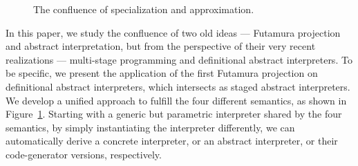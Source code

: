 \vspace{-1em}
\begin{figure}[h]
  \caption{The confluence of specialization and approximation.}
  \label{confluence}
\end{figure}
\vspace{-1em}

In this paper, we study the confluence of two old ideas --- Futamura projection
and abstract interpretation, but from the perspective of their very recent
realizations --- multi-stage programming and definitional abstract interpreters.
To be specific, we present the application of the first Futamura projection on
definitional abstract interpreters, which intersects as staged abstract
interpreters. We develop a unified approach to fulfill the four different
semantics, as shown in Figure~\ref{confluence}. Starting with a generic but
parametric interpreter shared by the four semantics, by simply instantiating
the interpreter differently, we can automatically derive a concrete interpreter,
or an abstract interpreter, or their code-generator versions, respectively.

